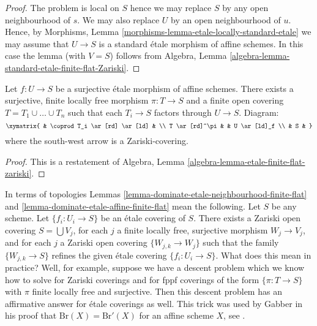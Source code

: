 \begin{proof}
The problem is local on $S$ hence we may replace $S$ by any
open neighbourhood of $s$.
We may also replace $U$ by an open neighbourhood of $u$.
Hence, by Morphisms, Lemma \ref{morphisms-lemma-etale-locally-standard-etale}
we may assume that
$U \to S$ is a standard \'etale morphism of affine schemes.
In this case the lemma (with $V = S$) follows from
Algebra, Lemma \ref{algebra-lemma-standard-etale-finite-flat-Zariski}.
\end{proof}

\begin{lemma}
\label{lemma-dominate-etale-affine-finite-flat}
Let $f : U \to S$ be a surjective \'etale morphism of affine schemes.
There exists a surjective, finite locally free morphism
$\pi : T \to S$ and a finite open covering
$T = T_1 \cup \ldots \cup T_n$ such that each
$T_i \to S$ factors through $U \to S$. Diagram:
$$
\xymatrix{
& \coprod T_i  \ar[rd] \ar[ld] & \\
T \ar[rd]^\pi & & U \ar[ld]_f \\
& S &
}
$$
where the south-west arrow is a Zariski-covering.
\end{lemma}

\begin{proof}
This is a restatement of
Algebra, Lemma \ref{algebra-lemma-etale-finite-flat-zariski}.
\end{proof}

\begin{remark}
\label{remark-topologies}
In terms of topologies
Lemmas \ref{lemma-dominate-etale-neighbourhood-finite-flat} and
\ref{lemma-dominate-etale-affine-finite-flat} mean the following.
Let $S$ be any scheme. Let $\{f_i : U_i \to S\}$ be an \'etale covering
of $S$. There exists a Zariski open covering $S = \bigcup V_j$,
for each $j$ a finite locally free, surjective morphism
$W_j \to V_j$, and for each $j$ a Zariski open covering
$\{W_{j, k} \to W_j\}$ such that the family
$\{W_{j, k} \to S\}$ refines the given \'etale covering
$\{f_i : U_i \to S\}$. What does this mean in practice?
Well, for example, suppose we have a descent problem which we
know how to solve for Zariski coverings and for fppf coverings
of the form $\{\pi : T \to S\}$ with $\pi$ finite locally free
and surjective. Then this descent problem has an affirmative
answer for \'etale coverings as well. This trick was used by
Gabber in his proof that $\text{Br}(X) = \text{Br}'(X)$
for an affine scheme $X$, see \cite{Hoobler}.
\end{remark}




